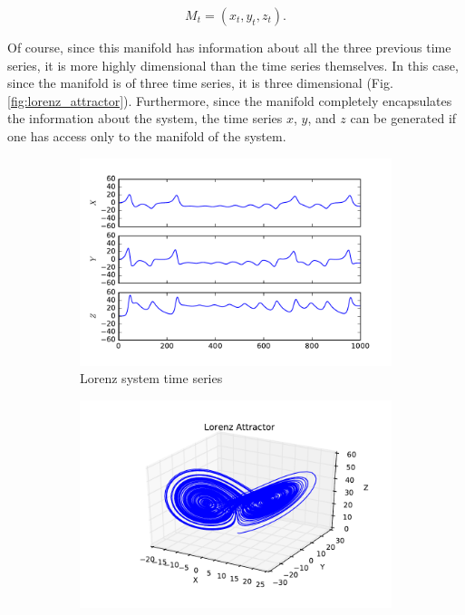 $$M_t = (x_t, y_t, z_t).$$

Of course, since this manifold has information about all the three previous time series, it is more highly dimensional than the time series themselves. In this case, since the manifold is of three time series, it is three dimensional (Fig. \ref{fig:lorenz_attractor}). Furthermore, since the manifold completely encapsulates the information about the system, the time series $x$, $y$, and $z$ can be generated if one has access only to the manifold of the system.

\begin{figure}
	\centering
	\begin{subfigure}{0.45\textwidth}
		\includegraphics[width=\linewidth]{figures/lorenz_series.pdf}
		\caption{Lorenz system time series}
		\label{fig:lorenz_time_series}
	\end{subfigure}
	\begin{subfigure}{0.45\linewidth}
		\includegraphics[width=\linewidth]{figures/lorenz.pdf}

\end{subfigure}
\end{figure}

